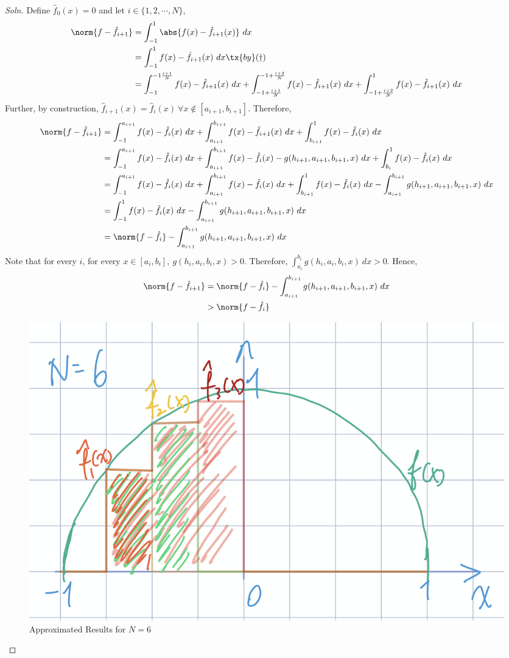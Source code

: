 \documentclass{article}
\begin{document}
\begin{proof}[Soln]
		Define $\hat{f}_0(x) = 0$ and let $i \in \{1, 2, \cdots, N\}$,
		\begin{align}
			\norm{f - \hat{f}_{i+1}}
			&= \int_{-1}^1 \abs{f(x) - \hat{f}_{i+1}(x)}\ dx \\
			&= \int_{-1}^1 f(x) - \hat{f}_{i+1}(x)\ dx \tx{ by }(\dagger)\\
			&= \int_{-1}^{-1 \frac{i+1}{N}} f(x) - \hat{f}_{i+1}(x)\ dx 
			+ \int_{-1+\frac{i+1}{N}}^{-1+\frac{i+2}{N}} f(x) - \hat{f}_{i+1}(x)\ dx 
			+ \int_{-1+\frac{i+2}{N}}^1 f(x) - \hat{f}_{i+1}(x)\ dx
		\end{align}
		Further, by construction, $\hat{f}_{i+1}(x) = \hat{f}_i(x)\ \forall x \notin [a_{i+1}, b_{i+1}]$. Therefore,
		\begin{align}
			\norm{f - \hat{f}_{i+1}}
			&= \int_{-1}^{a_{i+1}} f(x) - \hat{f}_i(x)\ dx 
			+ \int_{a_{i+1}}^{b_{i+1}} f(x) - \hat{f}_{i+1}(x)\ dx 
			+ \int_{b_{i+1}}^1 f(x) - \hat{f}_i(x)\ dx \\
			&= \int_{-1}^{a_{i+1}} f(x) - \hat{f}_i(x)\ dx 
			+ \int_{a_{i+1}}^{b_{i+1}} f(x) - \hat{f}_{i}(x) - g(h_{i+1}, a_{i+1}, b_{i+1}, x)\ dx 
			+ \int_{b_i}^1 f(x) - \hat{f}_i(x)\ dx \\
			&= \int_{-1}^{a_{i+1}} f(x) - \hat{f}_i(x)\ dx 
			+ \int_{a_{i+1}}^{b_{i+1}} f(x) - \hat{f}_{i}(x)\ dx 
			+ \int_{b_{i+1}}^1 f(x) - \hat{f}_i(x)\ dx 
			- \int_{a_{i+1}}^{b_{i+1}} g(h_{i+1}, a_{i+1}, b_{i+1}, x)\ dx \\
			&= \int_{-1}^1 f(x) - \hat{f}_i(x)\ dx - \int_{a_{i+1}}^{b_{i+1}} g(h_{i+1}, a_{i+1}, b_{i+1}, x)\ dx \\
			&= \norm{f - \hat{f}_{i}} - \int_{a_{i+1}}^{b_{i+1}} g(h_{i+1}, a_{i+1}, b_{i+1}, x)\ dx
		\end{align}
		Note that for every $i$, for every $x \in [a_i, b_i],\ g(h_i, a_i, b_i, x) > 0$. Therefore, $\int_{a_i}^{b_i} g(h_i, a_i, b_i, x)\ dx > 0$. Hence,
		\begin{align}
			\norm{f - \hat{f}_{i+1}} &= \norm{f - \hat{f}_{i}} - \int_{a_{i+1}}^{b_{i+1}} g(h_{i+1}, a_{i+1}, b_{i+1}, x)\ dx \\
			&> \norm{f - \hat{f}_{i}}
		\end{align}
		\begin{figure}[H]
			\center
			\includegraphics[width=0.7\linewidth]{plot_133.png}
			\caption{Approximated Results for $N=6$}
		\end{figure}
	\end{proof}
\end{document}
